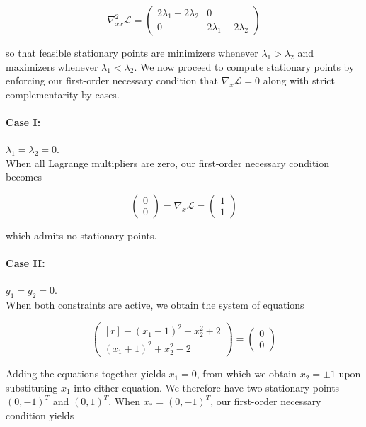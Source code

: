 \begin{solution}
    $$
    \nabla^2_{xx} \mathcal{L} = \begin{pmatrix*}
        2 \lambda_1 - 2 \lambda_2 & 0 \\
                                0 & 2 \lambda_1 - 2 \lambda_2
    \end{pmatrix*}
    $$
    
    so that feasible stationary points are minimizers whenever $\lambda_1 > \lambda_2$ and maximizers whenever 
    $\lambda_1 < \lambda_2$. We now proceed to compute stationary points by enforcing our first-order necessary 
    condition that $\nabla_x \mathcal{L} = 0$ along with strict complementarity by cases.

    \paragraph{Case I:} $\lambda_1 = \lambda_2 = 0.$ \ \\
    When all Lagrange multipliers are zero, our first-order necessary condition becomes

    $$
    \begin{pmatrix*}
        0 \\
        0
    \end{pmatrix*} = \nabla_x \mathcal{L} = \begin{pmatrix*}
        1 \\
        1
    \end{pmatrix*}
    $$

    which admits no stationary points.

    \paragraph{Case II:} $g_1 = g_2 = 0.$ \ \\
    When both constraints are active, we obtain the system of equations

    $$
    \begin{pmatrix*}[r]
        -(x_1 - 1)^2 - x_2^2 + 2 \\
         (x_1 + 1)^2 + x_2^2 - 2
    \end{pmatrix*} = \begin{pmatrix*}
        0 \\
        0
    \end{pmatrix*}
    $$

    Adding the equations together yields $x_1 = 0$, from which we obtain $x_2 = \pm 1$ upon substituting $x_1$ into 
    either equation. We therefore have two stationary points $(0, -1)^T$ and $(0, 1)^T$. When $x_* = (0, -1)^T$, our 
    first-order necessary condition yields


\end{solution}
